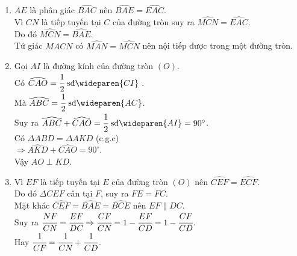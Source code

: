 \begin{ex}
{\begin{center}
		\end{center}
		\begin{enumerate}
			\item $ AE $ là phân giác $ \widehat{BAC} $ nên  $ \widehat{BAE}=\widehat{EAC} $.
			\\ Vì $ CN $ là tiếp tuyến tại $ C $ của đường tròn suy ra $ \widehat{MCN}=\widehat{EAC} $.
			\\ Do đó $ \widehat{MCN}=\widehat{BAE} $.
			\\ Tứ giác $ MACN $ có $ \widehat{MAN}=\widehat{MCN} $ nên nội tiếp được trong một đường tròn.
		\item Gọi $ AI $ là đường kính của đường tròn $ (O) $.
		\\Có $ \widehat{CAO}=\cfrac{1}{2} \text{ sđ} \wideparen{CI} $ .
		\\Mà $ \widehat{ABC}=\cfrac{1}{2}\text{ sđ}\wideparen{AC} $.
		\\ Suy ra $ \widehat{ABC}+\widehat{CAO}=\cfrac{1}{2}\text{ sđ} \wideparen{AI}=90^\circ$.
		\\ Có $ \Delta ABD=\Delta AKD $ (c.g.c)
		\\ $ \Rightarrow  \widehat{AKD}+\widehat{CAO}=90^\circ $.
		\\ Vậy $ AO \perp KD $.
		\item 
		Vì $ EF $ là tiếp tuyến tại $ E $ của đường tròn $ (O) $ nên $ \widehat{CEF}=\widehat{ECF} $.
		\\ Do đó $ \Delta CEF $ cân tại $ F $, suy ra $ FE=FC $.
		\\ Mặt khác $ \widehat{CEF}=\widehat{BAE}=\widehat{BCE} $ nên  $ EF \parallel DC $.
		\\ Suy ra $ \cfrac{NF}{CN}=\cfrac{EF}{DC} \Rightarrow \cfrac{CF}{CN}=1-\cfrac{EF}{CD}=1-\cfrac{CF}{CD}$.
		\\ Hay $\cfrac{1}{CF}=\cfrac{1}{CN}+\cfrac{1}{CD}   $.
		
 		\end{enumerate}
	}
\end{ex}

